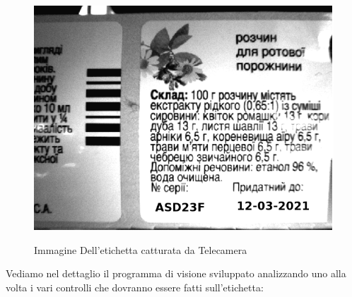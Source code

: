 \documentclass[12pt, a4paper, oneside]{book}
\begin{document}
\begin{figure}[H]
	\centering
	\includegraphics[width=13cm]{Immagini/VIS7}
	\label{vis7}
	\caption{Immagine Dell'etichetta catturata da Telecamera}
\end{figure}

Vediamo nel dettaglio il programma di visione sviluppato analizzando uno alla volta i vari controlli che dovranno essere fatti sull'etichetta:
\end{document}
